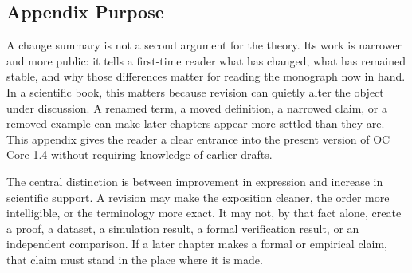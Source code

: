 \documentclass[11pt,a4paper,openany]{book}
\begin{document}
\subsection{Appendix Purpose}
A change summary is not a second argument for the theory. Its work is narrower and more public: it tells a first-time reader what has changed, what has remained stable, and why those differences matter for reading the monograph now in hand. In a scientific book, this matters because revision can quietly alter the object under discussion. A renamed term, a moved definition, a narrowed claim, or a removed example can make later chapters appear more settled than they are. This appendix gives the reader a clear entrance into the present version of OC Core 1.4 without requiring knowledge of earlier drafts. \cite{grimmett_percolation,goldenfeld_lectures}\par
The central distinction is between improvement in expression and increase in scientific support. A revision may make the exposition cleaner, the order more intelligible, or the terminology more exact. It may not, by that fact alone, create a proof, a dataset, a simulation result, a formal verification result, or an independent comparison. If a later chapter makes a formal or empirical claim, that claim must stand in the place where it is made.\par
\end{document}
